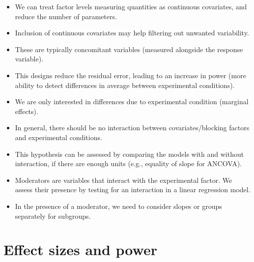 \documentclass[
  11pt,
  letterpaper,
]{scrbook}
\providecommand{\tightlist}{%
  \setlength{\itemsep}{0pt}\setlength{\parskip}{0pt}}\usepackage{longtable,booktabs,array}
\theoremstyle{definition}
\theoremstyle{definition}
\theoremstyle{remark}
\begin{document}
\begin{tcolorbox}[enhanced jigsaw, left=2mm, leftrule=.75mm, coltitle=black, breakable, bottomrule=.15mm, colframe=quarto-callout-important-color-frame, titlerule=0mm, colbacktitle=quarto-callout-important-color!10!white, rightrule=.15mm, toprule=.15mm, title=\textcolor{quarto-callout-important-color}{\faExclamation}\hspace{0.5em}{\textbf{Summary}}, opacityback=0, toptitle=1mm, bottomtitle=1mm, arc=.35mm, opacitybacktitle=0.6, colback=white]

\begin{itemize}
\tightlist
\item
  We can treat factor levels measuring quantities as continuous
  covariates, and reduce the number of parameters.
\item
  Inclusion of continuous covariates may help filtering out unwanted
  variability.
\item
  These are typically concomitant variables (measured alongside the
  response variable).
\item
  This designs reduce the residual error, leading to an increase in
  power (more ability to detect differences in average between
  experimental conditions).
\item
  We are only interested in differences due to experimental condition
  (marginal effects).
\item
  In general, there should be no interaction between covariates/blocking
  factors and experimental conditions.
\item
  This hypothesis can be assessed by comparing the models with and
  without interaction, if there are enough units (e.g., equality of
  slope for ANCOVA).
\item
  Moderators are variables that interact with the experimental factor.
  We assess their presence by testing for an interaction in a linear
  regression model.
\item
  In the presence of a moderator, we need to consider slopes or groups
  separately for subgroups.
\end{itemize}

\end{tcolorbox}


\chapter{Effect sizes and power}\label{effect-sizes-and-power}
\end{document}
